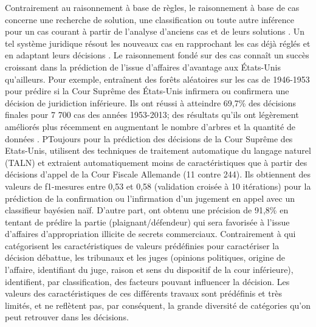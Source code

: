 Contrairement au raisonnement à base de règles, le raisonnement à base de cas concerne une recherche de solution, une classification ou toute autre inférence pour un cas courant à partir de l'analyse d'anciens cas et de leurs solutions \citep{moens2002case-basedreasoning}. Un tel système juridique résout les nouveaux cas en rapprochant les cas déjà réglés et en adaptant leurs décisions \citep{Berka2011rbr-cbr}. Le raisonnement fondé sur des cas connaît un succès croissant dans la prédiction de l'issue d'affaires d'avantage aux États-Unis qu'ailleurs. Pour exemple, \citet{katz2014predicting} entraînent des forêts aléatoires sur les cas de 1946-1953 pour prédire si la Cour Suprême des États-Unis infirmera ou confirmera une décision de juridiction inférieure. Ils ont réussi à atteindre 69,7\% des décisions finales pour 7 700 cas des années 1953-2013; des résultats qu'ils ont légèrement améliorés plus récemment en augmentant le nombre d'arbres et la quantité de données \citep{katz2017predictsupremecourt}. PToujours pour la prédiction des décisions de la Cour Suprême des Etats-Unis, \citet{waltl2017predictgermantaxlaw} utilisent des techniques de traitement automatique du langage naturel (TALN) et extraient automatiquement moins de caractéristiques que \citep{katz2014predicting}  à partir des décisions d'appel de la Cour Fiscale Allemande (11 contre 244). Ils obtiennent des valeurs de f1-mesures entre 0,53 et 0,58 (validation croisée à 10 itérations) pour la prédiction  de la confirmation ou l'infirmation d'un jugement en appel avec un classifieur bayésien naïf.  D'autre part, \cite{Ashley2009classifCases} ont obtenu une précision de 91,8\% en tentant de prédire la partie (plaignant/défendeur)  qui sera favorisée  à l'issue d'affaires d'appropriation illicite de secrets commerciaux. Contrairement à \citep{katz2014predicting} qui catégorisent les caractéristiques de valeurs prédéfinies pour caractériser la décision débattue, les tribunaux et les juges (opinions politiques, origine de l'affaire, identifiant du juge, raison et sens du dispositif de la cour inférieure), \cite{Ashley2009classifCases} identifient, par classification, des facteurs pouvant influencer la décision. Les valeurs des caractéristiques de ces différents travaux sont prédéfinis et très limités, et ne reflètent pas, par conséquent, la grande diversité de catégories qu'on peut retrouver dans les décisions. 

